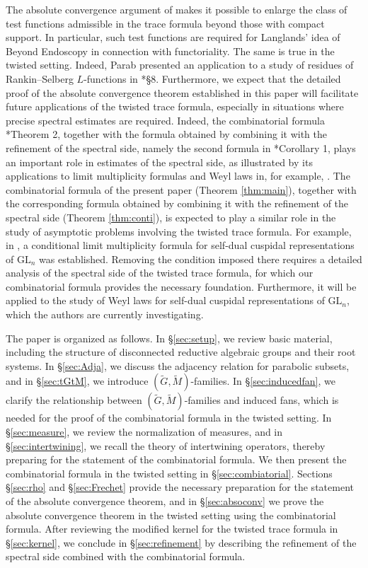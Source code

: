 \documentclass[12pt]{amsart}
\theoremstyle{definition}
\theoremstyle{plain}
\theoremstyle{remark}
\def\GL{\mathrm{GL}}
\numberwithin{equation}{section}
\newcommand{\tG}{\widetilde{G}}
\newcommand{\tM}{\widetilde{M}}
\begin{document}
The absolute convergence argument of \cite{FLM11} makes it possible to enlarge the class of test functions admissible in the trace formula beyond those with compact support.
In particular, such test functions are required for Langlands' idea of Beyond Endoscopy in connection with functoriality. 
The same is true in the twisted setting. 
Indeed, Parab presented an application to a study of residues of Rankin--Selberg $L$-functions in \cite{Par19}*{\S8}. 
Furthermore, we expect that the detailed proof of the absolute convergence theorem established in this paper will facilitate future applications of the twisted trace formula, especially in situations where precise spectral estimates are required.
Indeed, the combinatorial formula \cite{FLM11}*{Theorem 2}, together with the formula obtained by combining it with the refinement of the spectral side, namely the second formula in \cite{FLM11}*{Corollary 1}, plays an important role in estimates of the spectral side, as illustrated by its applications to limit multiplicity formulas and Weyl laws in, for example, \cites{FLM15,FM21}. 
The combinatorial formula of the present paper (Theorem \ref{thm:main}), together with the corresponding formula obtained by combining it with the refinement of the spectral side (Theorem \ref{thm:conti}), is expected to play a similar role in the study of asymptotic problems involving the twisted trace formula.
For example, in \cite{TW26}, a conditional limit multiplicity formula for self-dual cuspidal representations of $\GL_n$ was established. 
Removing the condition imposed there requires a detailed analysis of the spectral side of the twisted trace formula, for which our combinatorial formula provides the necessary foundation.
Furthermore, it will be applied to the study of Weyl laws for self-dual cuspidal representations of $\GL_n$, which the authors are currently investigating.


The paper is organized as follows.
In \S\ref{sec:setup}, we review basic material, including the structure of disconnected reductive algebraic groups and their root systems.
In \S\ref{sec:Adja}, we discuss the adjacency relation for parabolic subsets, and in \S\ref{sec:tGtM}, we introduce $(\tG,\tM)$-families.
In \S\ref{sec:inducedfan}, we clarify the relationship between $(\tG,\tM)$-families and induced fans, which is needed for the proof of the combinatorial formula in the twisted setting.
In \S\ref{sec:measure}, we review the normalization of measures, and in \S\ref{sec:intertwining}, we recall the theory of intertwining operators, thereby preparing for the statement of the combinatorial formula.
We then present the combinatorial formula in the twisted setting in \S\ref{sec:combiatorial}.
Sections \S\ref{sec:rho} and \S\ref{sec:Frechet} provide the necessary preparation for the statement of the absolute convergence theorem, and in \S\ref{sec:absoconv} we prove the absolute convergence theorem in the twisted setting using the combinatorial formula.
After reviewing the modified kernel for the twisted trace formula in \S\ref{sec:kernel}, we conclude in \S\ref{sec:refinement} by describing the refinement of the spectral side combined with the combinatorial formula.
\end{document}
